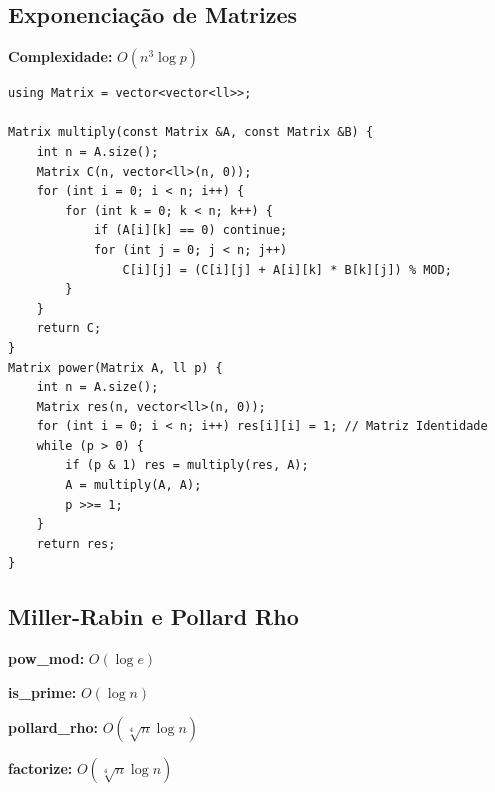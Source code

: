 \subsection{Exponenciação de Matrizes}

\textbf{Complexidade:} $O(n^3 \log p)$

\begin{lstlisting}
using Matrix = vector<vector<ll>>;

Matrix multiply(const Matrix &A, const Matrix &B) {
    int n = A.size();
    Matrix C(n, vector<ll>(n, 0));
    for (int i = 0; i < n; i++) {
        for (int k = 0; k < n; k++) {
            if (A[i][k] == 0) continue;
            for (int j = 0; j < n; j++)
                C[i][j] = (C[i][j] + A[i][k] * B[k][j]) % MOD;
        }
    }
    return C;
}
Matrix power(Matrix A, ll p) {
    int n = A.size();
    Matrix res(n, vector<ll>(n, 0));
    for (int i = 0; i < n; i++) res[i][i] = 1; // Matriz Identidade
    while (p > 0) {
        if (p & 1) res = multiply(res, A);
        A = multiply(A, A);
        p >>= 1;
    }
    return res;
}
\end{lstlisting}

\subsection{Miller-Rabin e Pollard Rho}

\textbf{pow\_mod:} $O(\log e)$

\textbf{is\_prime:} $O(\log n)$

\textbf{pollard\_rho:} $O(\sqrt[4]{n} \log n)$

\textbf{factorize:} $O(\sqrt[4]{n} \log n)$

